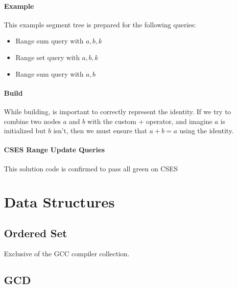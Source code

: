 \documentclass[a4paper,10pt,twocolumn, titlepage]{article}
\begin{document}
\paragraph{Example} This example segment tree is prepared for the following queries:
\begin{itemize}
 \item Range sum query with $a, b, k$
 \item Range set query with $a, b, k$
 \item Range sum query with $a, b$
\end{itemize}



\paragraph{Build} While building, is important to correctly represent the identity. If we try to combine two nodes $a$ and $b$ with the custom $+$ operator, and imagine $a$ is initialized but $b$ isn't, then we must ensure that $a+b = a$ using the identity.



\paragraph{CSES Range Update Queries}
This solution code is confirmed to pass all green on CSES



\section{Data Structures} %
\subsection{Ordered Set}

Exclusive of the GCC compiler collection.





\subsection{GCD}
\end{document}
